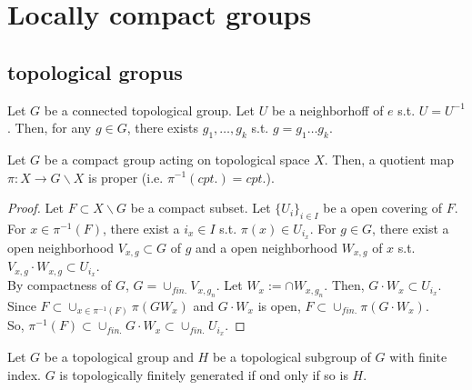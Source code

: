\section{Locally compact groups}

\subsection{topological gropus}

\begin{theorem}
  Let $G$ be a connected topological group.
  Let $U$ be a neighborhoff of $e$ s.t. $U = U^{-1}$.
  Then, for any $ g \in G$, there exists $g_1, \ldots , g_k$ s.t. $g = g_1 \ldots g_k$.
\end{theorem}

\begin{theorem}
  Let $G$ be a compact group acting on topological space $X$.
  Then, a quotient map $\pi:X \rightarrow G \backslash X$ is proper (i.e. $\pi^{-1}(cpt.)=cpt.$).
\end{theorem}

\begin{proof}
  Let $F \subset X \backslash G$ be a compact subset.
  Let $\{U_i\}_{i \in I}$ be a open covering of $F$.\\
  For $ x \in \pi^{-1}(F)$, there exist a $i_x \in I$ s.t. $ \pi(x) \in U_{i_x}$.
  For $g \in G$, there exist a open neighborhood $V_{x,g} \subset G$ of $g$ and a open neighborhood $W_{x,g}$ of $x$ s.t. $V_{x,g}\cdot W_{x,g} \subset U_{i_x}$.\\
  By compactness of $G$, $G = \cup_{fin.}V_{x,g_n}$.
  Let $W_x := \cap W_{x,g_n}$.
  Then, $G\cdot W_x \subset U_{i_x}$.\\
  Since $F \subset \cup_{x \in \pi^{-1}(F)} \pi(G W_x)$ and $G\cdot W_x$ is open, $F \subset \cup_{fin.} \pi(G\cdot W_x)$. \\
  So, $\pi^{-1}(F) \subset \cup_{fin.}G\cdot W_x \subset \cup_{fin.} U_{i_x}$.
\end{proof}

\begin{proposition}
  Let $G$ be a topological group and $H$ be a topological subgroup of $G$ with finite index.
  $G$ is topologically finitely generated if ond only if so is $H$.
\end{proposition}

